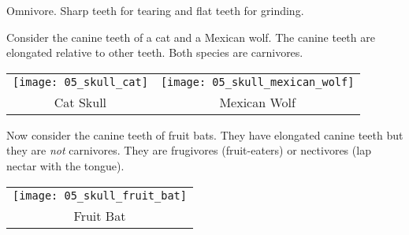 \documentclass[12pt, hidelinks]{exam}
\newcommand*\AnswerBox[2]{%
    \parbox[t][#1]{0.92\textwidth}{%
    \begin{solution}#2\end{solution}}
}
\begin{document}
\begin{questions}
\begin{parts}
\AnswerBox{1\baselineskip}{Omnivore. Sharp teeth for tearing and flat teeth for grinding.}

\end{parts}

\newpage

\question[2]
Consider the canine teeth of a cat and a Mexican wolf. The canine teeth
are elongated relative to other teeth. Both species are carnivores. %

\begin{longtable}[c]{@{}cc@{}}
\toprule
\texttt{[image: 05\_skull\_cat]} &
\texttt{[image: 05\_skull\_mexican\_wolf]}\tabularnewline
Cat Skull & Mexican Wolf\tabularnewline
\bottomrule
\end{longtable}


\question[2]
Now consider the canine teeth of fruit bats. They have elongated canine teeth but they are
\emph{not} carnivores. They are frugivores (fruit-eaters) or nectivores 
(lap nectar with the tongue).

\begin{longtable}[c]{@{}c@{}}
\toprule
\texttt{[image: 05\_skull\_fruit\_bat]}\tabularnewline
Fruit Bat\tabularnewline
\bottomrule
\end{longtable}

\end{questions}
\end{document}
